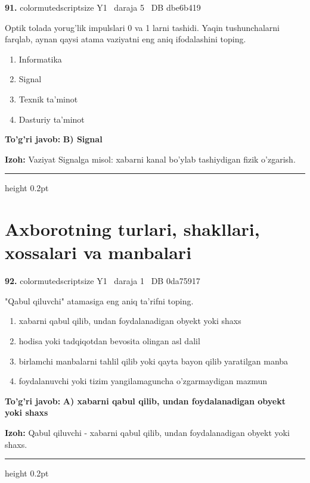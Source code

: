 \documentclass[10pt,a4paper,oneside]{article}
\begin{document}
\noindent\textbf{\color{ink}91.}  {color{muted}scriptsize Y1 \textbullet\ daraja 5 \textbullet\ DB dbe6b419}
\par
Optik tolada yorug'lik impulslari 0 va 1 larni tashidi. Yaqin tushunchalarni farqlab, aynan qaysi atama vaziyatni eng aniq ifodalashini toping.
\begin{enumerate}[label=\Alph*),leftmargin=9mm]
\item Informatika
\item Signal
\item Texnik ta'minot
\item Dasturiy ta'minot
\end{enumerate}
\begin{tcolorbox}[enhanced,breakable,colback=teal!4,colframe=teal!50!black,boxrule=0.5pt,arc=1.1mm,left=3mm,right=3mm,top=1.7mm,bottom=1.7mm,before skip=2mm,after skip=2mm]
\textbf{\color{teal}To'g'ri javob:} \textbf{B) Signal}
\par\smallskip
\textbf{Izoh:} Vaziyat Signalga misol: xabarni kanal bo'ylab tashiydigan fizik o'zgarish.
\end{tcolorbox}
\vspace{2mm}\hrule height 0.2pt \vspace{3mm}
\section{Axborotning turlari, shakllari, xossalari va manbalari}

\noindent\textbf{\color{ink}92.}  {color{muted}scriptsize Y1 \textbullet\ daraja 1 \textbullet\ DB 0da75917}
\par
"Qabul qiluvchi" atamasiga eng aniq ta'rifni toping.
\begin{enumerate}[label=\Alph*),leftmargin=9mm]
\item xabarni qabul qilib, undan foydalanadigan obyekt yoki shaxs
\item hodisa yoki tadqiqotdan bevosita olingan asl dalil
\item birlamchi manbalarni tahlil qilib yoki qayta bayon qilib yaratilgan manba
\item foydalanuvchi yoki tizim yangilamaguncha o'zgarmaydigan mazmun
\end{enumerate}
\begin{tcolorbox}[enhanced,breakable,colback=teal!4,colframe=teal!50!black,boxrule=0.5pt,arc=1.1mm,left=3mm,right=3mm,top=1.7mm,bottom=1.7mm,before skip=2mm,after skip=2mm]
\textbf{\color{teal}To'g'ri javob:} \textbf{A) xabarni qabul qilib, undan foydalanadigan obyekt yoki shaxs}
\par\smallskip
\textbf{Izoh:} Qabul qiluvchi - xabarni qabul qilib, undan foydalanadigan obyekt yoki shaxs.
\end{tcolorbox}
\vspace{2mm}\hrule height 0.2pt \vspace{3mm}
\end{document}
